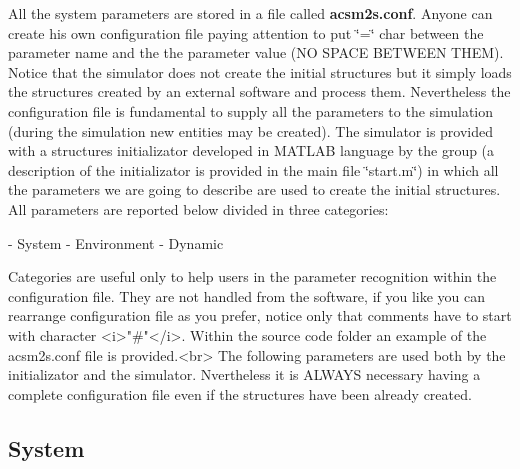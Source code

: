  All the system parameters are stored in a file called {\bfseries acsm2s.\+conf}. Anyone can create his own configuration file paying attention to put \char`\"{}=\char`\"{} char between the parameter name and the the parameter value (N\+O S\+P\+A\+C\+E B\+E\+T\+W\+E\+E\+N T\+H\+E\+M).~\newline
 Notice that the simulator does not create the initial structures but it simply loads the structures created by an external software and process them. Nevertheless the configuration file is fundamental to supply all the parameters to the simulation (during the simulation new entities may be created). The simulator is provided with a structures initializator developed in M\+A\+T\+L\+A\+B language by the group (a description of the initializator is provided in the main file \char`\"{}start.\+m\char`\"{}) in which all the parameters we are going to describe are used to create the initial structures. All parameters are reported below divided in three categories\+: \begin{DoxyVerb}          - System
          - Environment
          - Dynamic

          Categories are useful only to help users in the parameter recognition within the configuration file. They are not handled from the software, if you like you can rearrange configuration file as you prefer, notice only that comments have to start with character <i>"#"</i>. Within the source code folder an example of the acsm2s.conf file is provided.<br>
 The following parameters are used both by the initializator and the simulator. Nvertheless it is ALWAYS necessary having a complete configuration file even if the structures have been already created.
\end{DoxyVerb}
 \hypertarget{a00002_paramsystem}{}\subsection{System}\label{a00002_paramsystem}

